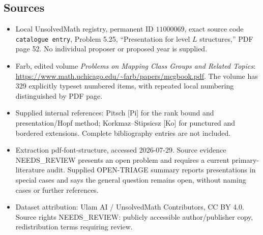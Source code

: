\documentclass[11pt]{article}
\begin{document}
\subsection{Sources}
\begin{itemize}
\item Local UnsolvedMath registry, permanent ID \(11000069\), exact source code \texttt{catalogue entry}, Problem 5.25, ``Presentation for level \(L\) structures,'' PDF page 52. No individual proposer or proposed year is supplied.
\item Farb, edited volume \emph{Problems on Mapping Class Groups and Related Topics}: \url{https://www.math.uchicago.edu/~farb/papers/mcgbook.pdf}. The volume has 329 explicitly typeset numbered items, with repeated local numbering distinguished by PDF page.
\item Supplied internal references: Pitsch [Pi] for the rank bound and presentation/Hopf method; Korkmaz--Stipsicsz [Ko] for punctured and bordered extensions. Complete bibliography entries are not included.
\item Extraction pdf-font-structure, accessed 2026-07-29. Source evidence NEEDS\_REVIEW presents an open problem and requires a current primary-literature audit. Supplied OPEN-TRIAGE summary reports presentations in special cases and says the general question remains open, without naming cases or further references.
\item Dataset attribution: Ulam AI / UnsolvedMath Contributors, CC BY 4.0. Source rights NEEDS\_REVIEW: publicly accessible author/publisher copy, redistribution terms requiring review.
\end{itemize}
\end{document}
